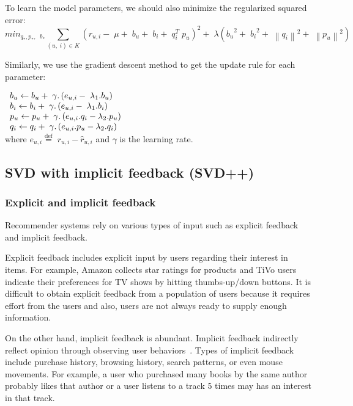 \documentclass[oneside,13pt]{extreport}
\begin{document}
To learn the model parameters, we should also minimize the regularized squared error:
\begin{equation}
mi{n_{{q_*},{p_*},\;\;{b_*}}}\mathop \sum \limits_{\left( {u,\;i} \right) \in K} {\left( {{r_{u,i}} - \;\mu  + \;{b_u} + \;{b_i} + \;q_i^T\;{p_u}} \right)^2} + \;\lambda \left( {{b_u}^2 + \;{b_i}^2 + \;{{\left\| {{q_i}} \right\|}^2} + \;{{\left\| {{p_u}} \right\|}^2}} \right)
\end{equation}

Similarly, we use the gradient descent method to get the update rule for each parameter:

$
\begin{array}{l}{b_u} \leftarrow {b_u} + {\rm{\;}}\gamma .\left( {{e_{u,i}} - {\rm{\;}}{\lambda _1}.{b_u}} \right)\\{b_i} \leftarrow {b_i} + {\rm{\;}}\gamma .\left( {{e_{u,i}} - {\rm{\;}}{\lambda _1}.{b_i}} \right)\\{p_u} \leftarrow {p_u} + {\rm{\;}}\gamma .\left( {{e_{u,i}}.{q_i} - {\lambda _2}.{p_u}} \right)\\{q_i} \leftarrow {q_i} + {\rm{\;}}\gamma .\left( {{e_{u,i}}.{p_u} - {\lambda _2}.{q_i}} \right)\end{array}
$
\\
where ${e_{u,i}} \stackrel{\text{def}}{=} \;{r_{u,i}} - \hat r_{u,i}$ and $\gamma$ is the learning rate.

\subsection{SVD with implicit feedback (SVD++)}
\subsubsection{Explicit and implicit feedback}
Recommender systems rely on various types of input such as explicit feedback and implicit feedback. 

Explicit feedback includes explicit input by users regarding their interest in items. For example, Amazon collects star ratings for products and TiVo users indicate their
preferences for TV shows by hitting thumbs-up/down buttons. It is difficult to obtain explicit  feedback from a population of users because it requires effort from the users and also, users are not always ready to supply enough information. 

 On the other hand, implicit feedback is abundant. Implicit feedback indirectly reflect opinion through observing user behaviors~\cite{Oard98}. Types of implicit feedback include purchase history, browsing history, search patterns, or even mouse movements. For
example, a user who purchased many books by the same author probably likes that
author or  a user listens to a track 5 times may has an interest in that track.
\end{document}
